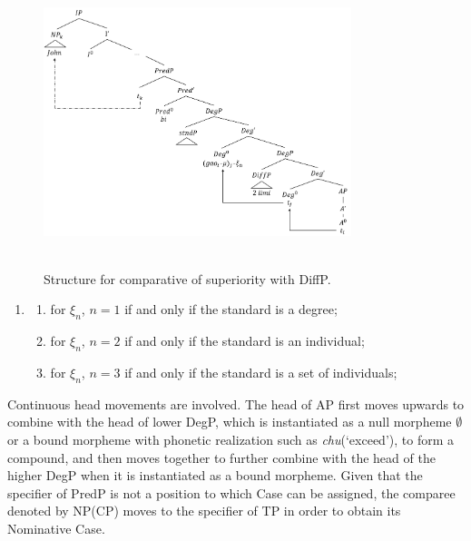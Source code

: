 \documentclass{ctexart}
\begin{document}
\begin{figure}[H]
    \centering
    \includegraphics[width=0.8\textwidth]{pic/superiority_structure_diff.png}
    \begin{caption}
        \\ \vspace{-1.1ex}
        Structure for comparative of superiority with DiffP.
    \end{caption}
\end{figure}

\begin{enumerate}
    \item \label{superiority_example_10}
    \begin{enumerate}
        \item \label{superiority_example_10_a}
        for $\xi_n$, $n=1$ if and only if the standard is a degree;

        \item \label{superiority_example_10_b}
        for $\xi_n$, $n=2$ if and only if the standard is an individual;

        \item \label{superiority_example_10_c}
        for $\xi_n$, $n=3$ if and only if the standard is a set of individuals;

    \end{enumerate}
\end{enumerate}

Continuous head movements are involved. The head of AP first moves upwards to combine with the head of lower DegP, which is instantiated as a null morpheme $\emptyset$ or a bound morpheme with phonetic realization such as \textit{chu}(`exceed'), to form a compound, and then moves together to further combine with the head of the higher DegP when it is instantiated as a bound morpheme. Given that the specifier of PredP is not a position to which Case can be assigned, the comparee denoted by NP(CP) moves to the specifier of TP in order to obtain its Nominative Case.
\end{document}
